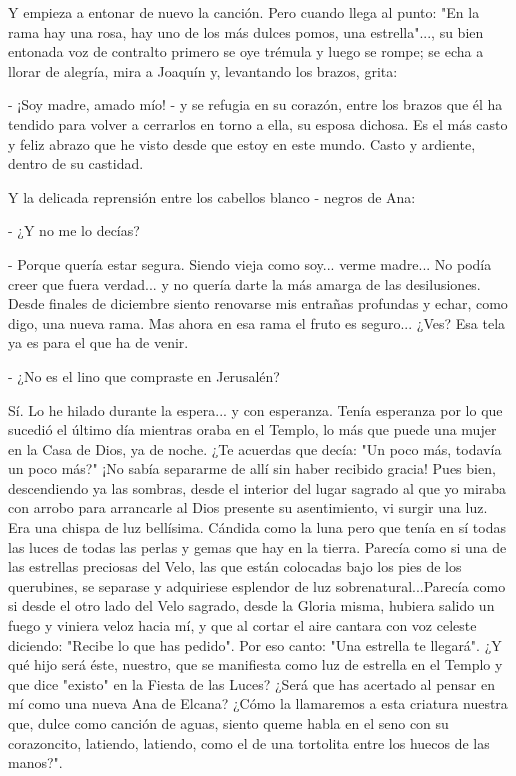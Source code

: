\documentclass[12pt]{book} %
\begin{document}
Y empieza a entonar de nuevo la canción. Pero cuando llega al punto: "En la rama hay una rosa, hay uno de los más dulces pomos, una estrella"..., su bien entonada voz de contralto primero se oye trémula y luego se rompe; se echa a llorar de alegría, mira a Joaquín y, levantando los brazos, grita: 

- ¡Soy madre, amado mío! - y se refugia en su corazón, entre los brazos que él ha tendido para volver a cerrarlos en torno a ella, su esposa dichosa. Es el más casto y feliz abrazo que he visto desde que estoy en este mundo. Casto y ardiente, dentro de su castidad. 

Y la delicada reprensión entre los cabellos blanco - negros de Ana: 

- ¿Y no me lo decías? 

- Porque quería estar segura. Siendo vieja como soy... verme madre... No podía creer que fuera verdad... y no quería darte la más amarga de las desilusiones. Desde finales de diciembre siento renovarse mis entrañas profundas y echar, como digo, una nueva rama. Mas ahora en esa rama el fruto es seguro... ¿Ves? Esa tela ya es para el que ha de venir. 

- ¿No es el lino que compraste en Jerusalén? 

Sí. Lo he hilado durante la espera... y con esperanza. Tenía esperanza por lo que sucedió el último día mientras oraba en el Templo, lo más que puede una mujer en la Casa de Dios, ya de noche. ¿Te acuerdas que decía: "Un poco más, todavía un poco más?" ¡No sabía separarme de allí sin haber recibido gracia! Pues bien, descendiendo ya las sombras, desde el interior del lugar sagrado al que yo miraba con arrobo para arrancarle al Dios presente su asentimiento, vi surgir una luz. Era una chispa de luz bellísima. Cándida como la luna pero que tenía en sí todas las luces de todas las perlas y gemas que hay en la tierra. Parecía como si una de las estrellas preciosas del Velo, las que están colocadas bajo los pies de los querubines, se separase y adquiriese esplendor de luz sobrenatural...Parecía como si desde el otro lado del Velo sagrado, desde la Gloria misma, hubiera salido un fuego y viniera veloz hacia mí, y que al cortar el aire cantara con voz celeste diciendo: "Recibe lo que has pedido". Por eso canto: "Una estrella te llegará". ¿Y qué hijo será éste, nuestro, que se manifiesta como luz de estrella en el Templo y que dice "existo" en la Fiesta de las Luces? ¿Será que has acertado al pensar en mí como una nueva Ana de Elcana? ¿Cómo la llamaremos a esta criatura nuestra que, dulce como canción de aguas, siento queme habla en el seno con su corazoncito, latiendo, latiendo, como el de una tortolita entre los huecos de las manos?". 
\end{document}
